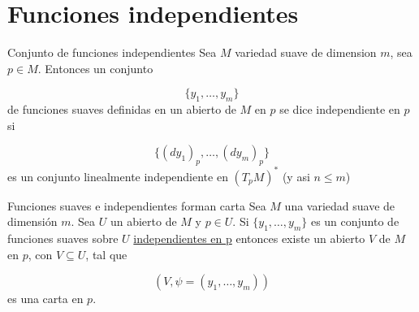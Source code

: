\section{Funciones independientes}
\begin{bookproposition}{Conjunto de funciones independientes}
Sea $M$ variedad suave de dimension $m$, sea $p \in M$.  Entonces un conjunto

\[
\{y_1,\ldots,y_m\}
\]
de funciones suaves definidas en un abierto de $M$ en $p$ se dice independiente en $p$ si

\[
\{(dy_1)_p,\ldots,(dy_m)_p\}
\]
es un conjunto linealmente independiente en $(T_{p}M)^{*}$ (y asi $n\leq m$)

\end{bookproposition}
\label{blk:conjunto-funciones-independientes}
\begin{bookproposition}{Funciones suaves e independientes forman carta}
Sea $M$ una variedad suave de dimensión $m$. Sea $U$ un abierto de $M$ y $p\in U$. Si $\{y_1,\ldots,y_m\}$ es un conjunto de funciones suaves sobre $U$ \hyperref[blk:conjunto-funciones-independientes]{independientes en p} entonces existe un abierto $V$ de $M$ en $p$, con $V\subseteq U$, tal que

\[
(V,\psi=(y_1,\ldots,y_m))
\]
es una carta en $p$.

\end{bookproposition}
